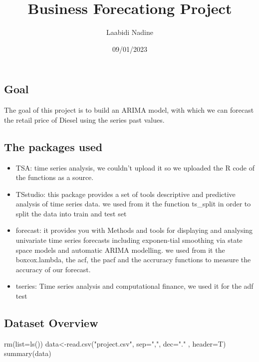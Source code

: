 \documentclass[
]{article}
\title{Business Forecationg Project}
\author{Laabidi Nadine}
\date{09/01/2023}
\newenvironment{Shaded}{\begin{snugshade}}{\end{snugshade}}
\newcommand{\AttributeTok}[1]{\textcolor[rgb]{0.77,0.63,0.00}{#1}}
\newcommand{\FunctionTok}[1]{\textcolor[rgb]{0.00,0.00,0.00}{#1}}
\newcommand{\NormalTok}[1]{#1}
\newcommand{\OtherTok}[1]{\textcolor[rgb]{0.56,0.35,0.01}{#1}}
\newcommand{\StringTok}[1]{\textcolor[rgb]{0.31,0.60,0.02}{#1}}
\begin{document}
\maketitle

\hypertarget{goal}{%
\subsection{Goal}\label{goal}}

The goal of this project is to build an ARIMA model, with which we can
forecast the retail price of Diesel using the series past values.

\hypertarget{the-packages-used}{%
\subsection{The packages used}\label{the-packages-used}}

\begin{itemize}
\item
  TSA: time series analysis, we couldn't upload it so we uploaded the R
  code of the functions as a source.
\item
  TSstudio: this package provides a set of tools descriptive and
  predictive analysis of time series data. we used from it the function
  ts\_split in order to split the data into train and test set
\item
  forecast: it provides you with Methods and tools for displaying and
  analysing univariate time series forecasts including exponen-tial
  smoothing via state space models and automatic ARIMA modelling. we
  used from it the boxcox.lambda, the acf, the pacf and the accruracy
  functions to measure the accuracy of our forecast.
\item
  tseries: Time series analysis and computational finance, we used it
  for the adf test
\end{itemize}

\hypertarget{dataset-overview}{%
\subsection{Dataset Overview}\label{dataset-overview}}

\begin{Shaded}
\begin{Highlighting}[]
\FunctionTok{rm}\NormalTok{(}\AttributeTok{list=}\FunctionTok{ls}\NormalTok{())}
\NormalTok{data}\OtherTok{\textless{}{-}}\FunctionTok{read.csv}\NormalTok{(}\StringTok{"project.csv"}\NormalTok{,  }\AttributeTok{sep=}\StringTok{","}\NormalTok{, }\AttributeTok{dec=}\StringTok{"."}\NormalTok{ , }\AttributeTok{header=}\NormalTok{T)}
\FunctionTok{summary}\NormalTok{(data)}
\end{Highlighting}
\end{Shaded}
\end{document}
